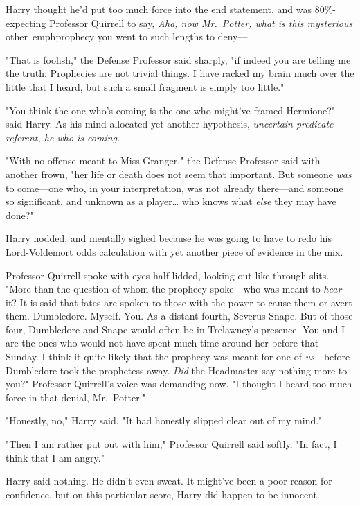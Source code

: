 Harry thought he'd put too much force into the end statement, and was 
80\%-expecting Professor Quirrell to say, \emph{Aha, now Mr.~Potter, what is 
this mysterious} other\ emph{prophecy you went to such lengths to deny---}

"That is foolish," the Defense Professor said sharply, "if indeed you are 
telling me the truth. Prophecies are not trivial things. I have racked my brain 
much over the little that I heard, but such a small fragment is simply too 
little."

"You think the one who's coming is the one who might've framed Hermione?" said 
Harry. As his mind allocated yet another hypothesis, \emph{uncertain predicate 
referent, he-who-is-coming.}

"With no offense meant to Miss Granger," the Defense Professor said with 
another frown, "her life or death does not seem that important. But someone 
\emph{was} to come---one who, in your interpretation, was not already 
there---and someone so significant, and unknown as a player{\ldots} who knows 
what \emph{else} they may have done?"

Harry nodded, and mentally sighed because he was going to have to redo his 
Lord-Voldemort odds calculation with yet another piece of evidence in the mix.

Professor Quirrell spoke with eyes half-lidded, looking out like through slits. 
"More than the question of whom the prophecy spoke---who was meant to 
\emph{hear} it? It is said that fates are spoken to those with the power to 
cause them or avert them. Dumbledore. Myself. You. As a distant fourth, Severus 
Snape. But of those four, Dumbledore and Snape would often be in Trelawney's 
presence. You and I are the ones who would not have spent much time around her 
before that Sunday. I think it quite likely that the prophecy was meant for one 
of \emph{us}---before Dumbledore took the prophetess away. \emph{Did} the 
Headmaster say nothing more to you?" Professor Quirrell's voice was demanding 
now. "I thought I heard too much force in that denial, Mr.~Potter."

"Honestly, no," Harry said. "It had honestly slipped clear out of my mind."

"Then I am rather put out with him," Professor Quirrell said softly. "In fact, 
I think that I am angry."

Harry said nothing. He didn't even sweat. It might've been a poor reason for 
confidence, but on this particular score, Harry did happen to be innocent.


